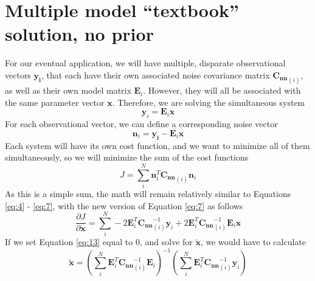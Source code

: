 \documentclass{article}
\begin{document}
\section{Multiple model ``textbook'' solution, no prior}
For our eventual application, we will have multiple, disparate observational vectors $\mathbf{y_{i}}$, that each have their own associated noise covariance matrix $\mathbf{C_{nn}}_{(i)}$, as well as their own model matrix $\mathbf{E}_i$. However, they will all be associated with the same parameter vector $\mathbf{x}$. Therefore, we are solving the simultaneous system
\begin{equation}
\label{eq:10}
\mathbf{y}_{i} = \mathbf{E}_{i}\mathbf{x}
\end{equation}
For each observational vector, we can define a corresponding noise vector
\begin{equation}
\label{eq:11}
\mathbf{n}_{i} = \mathbf{y_{i}} - \mathbf{E}_i\mathbf{x}
\end{equation}
Each system will have its own cost function, and we want to minimize all of them simultaneously, so we will minimize the sum of the cost functions
\begin{equation}
\label{eq:12}
J = \sum^{N}_{i} \mathbf{n}_{i}^T\mathbf{C_{nn}}_{(i)}\mathbf{n}_{i}
\end{equation}
As this is a simple sum, the math will remain relatively similar to Equations \ref{eq:4} - \ref{eq:7}, with the new version of Equation \ref{eq:7} as follows
\begin{equation}
\label{eq:13}
\frac{\partial J}{\partial \mathbf{x}} = \sum_{i}^{N} -2 \mathbf{E}_{i}^{T} \mathbf{C_{nn}}^{-1}_{(i)}\mathbf{y}_{i} + 2 \mathbf{E}^{T}_{i}\mathbf{C_{nn}}^{-1}_{(i)}\mathbf{E}_i\mathbf{x}
\end{equation}
If we set Equation \ref{eq:13} equal to 0, and solve for $\mathbf{\tilde{x}}$, we would have to calculate
\begin{equation}
\label{eq:14}
\mathbf{\tilde{x}} = \left(\sum_{i}^{N}\mathbf{E}^{T}_{i}\mathbf{C_{nn}}^{-1}_{(i)}\mathbf{E}_i\right)^{-1} \left(\sum_{i}^{N} \mathbf{E}_{i}^{T} \mathbf{C_{nn}}^{-1}_{(i)}\mathbf{y}_{i}\right)
\end{equation}
\end{document}
